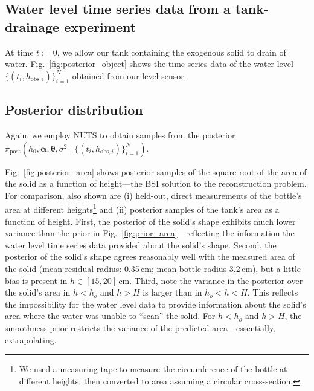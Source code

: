 \documentclass[openacc]{rsproca_new}%
\newcommand\thedata {$\{(t_i,h_{\text{obs}, i})\}_{i=1}^{N}$\xspace}
\newcommand\thedatanomath {\{(t_i,h_{\text{obs}, i})\}_{i=1}^{N}}
\begin{document}
\subsection{Water level time series data from a tank-drainage experiment}
At time $t:=0$, we allow our tank containing the exogenous solid to drain of water. Fig.~\ref{fig:posterior_object} shows the time series data of the water level \thedata obtained from our level sensor.

\subsection{Posterior distribution}
Again, we employ NUTS to obtain samples from the posterior $\pi_{\text{post}}(h_0, \boldsymbol \alpha, \boldsymbol \theta, \sigma^2 \mid \thedatanomath)$. 

Fig.~\ref{fig:posterior_area} shows posterior samples of the square root of the area of the solid as a function of height---the BSI solution to the reconstruction problem. 
For comparison, also shown are (i) held-out, direct measurements of the bottle's area at different heights\footnote{We used a measuring tape to measure the circumference of the bottle at different heights, then converted to area assuming a circular cross-section.} and (ii) posterior samples of the tank's area as a function of height. First, the posterior of the solid's shape exhibits much lower variance than the prior in Fig.~\ref{fig:prior_area}---reflecting the information the water level time series data provided about the solid's shape. 
Second, the posterior of the solid's shape agrees reasonably well with the measured area of the solid (mean residual radius: 0.35\,cm; mean bottle radius 3.2\,cm), but a little bias is present in $h\in[15, 20]$\,cm.
Third, note the variance in the posterior over the solid's area in $h<h_o$ and $h>H$ is larger than in $h_o < h < H$. This reflects the impossibility for the water level data to provide information about the solid's area where the water was unable to ``scan'' the solid. 
For $h<h_o$ and $h>H$, the smoothness prior restricts the variance of the predicted area---essentially, extrapolating. 
\end{document}
